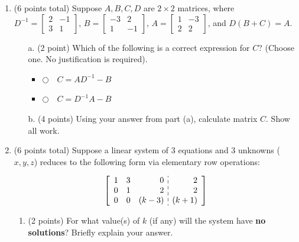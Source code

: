 \documentclass[12pt]{extarticle}
\newcommand{\chooseone}{{\Large$\Circle$\ \ }}
\begin{document}
\begin{enumerate}
\begin{itemize}
\end{itemize}
 \newpage



   
    \item  (6 points total) Suppose $A,B,C,D$ are $2\times 2$ matrices, where $D^{-1}=\begin{bmatrix} 2 & -1 \\ 3 & 1\end{bmatrix}$, $B=\begin{bmatrix} -3 & 2\\ 1 & -1\end{bmatrix}$, $A=\begin{bmatrix} 1 & -3 \\ 2 & 2\end{bmatrix}$, and $D(B+C)=A$. 
  
\begin{itemize}
\item[a.] (2 point)  Which of the following is a correct expression for $C$? (Choose one. No justification is required).
\begin{itemize}[label={}]
\item \chooseone $C=AD^{-1}-B$
\item \chooseone $C=D^{-1}A-B$
\end{itemize} %
\vspace{0.2in}

\item[b.] (4 points) Using your answer from part (a), calculate matrix $C$. Show all work.

\end{itemize}

    \newpage

  \item (6 points total)  Suppose a linear system of 3 equations and 3 unknowns ($x,y,z$) reduces to the following form via elementary row operations:
 
        \[ 
\barray{rrr;{4pt/3pt}r}{
1 & 3 & 0 & 2 \\ 0 & 1 & 2 & 2 \\ 0& 0 & (k-3)& (k+1)} 
\]   
  
  
  
  
    \begin{enumerate}
        \item (2 points)  For what value(s) of $k$ (if any) will the system have \textbf{no solutions}? Briefly explain your answer.
        \vspace{1.5in}
        

\end{enumerate}
\end{enumerate}
\end{document}
